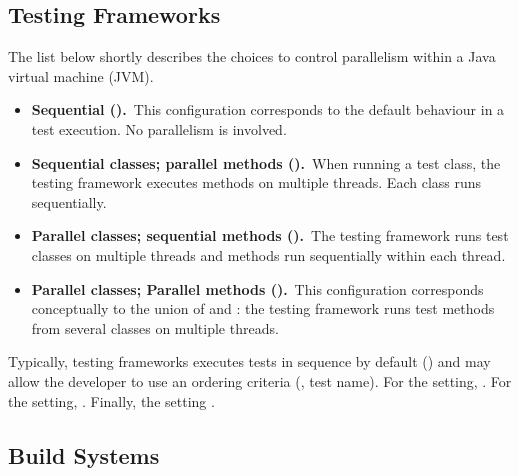 

\subsection{Testing Frameworks}
\label{sec:frameworks}

The list below shortly describes the choices to control parallelism
within a Java virtual machine (JVM).

\begin{itemize}
\item
    \textbf{Sequential (\Seq).}~This configuration corresponds to the
        default behaviour in a test execution. No parallelism is
        involved.
\item
    \textbf{Sequential classes; parallel methods
        (\SeqClassParMeth).}~When running a test class, the testing
        framework executes methods on multiple threads. Each class
        runs sequentially.
\item
    \textbf{Parallel classes; sequential methods
        (\ParClassSeqMeth{}).}~The testing framework runs test classes
        on multiple threads and methods run sequentially within each
        thread.
\item
    \textbf{Parallel classes; Parallel methods
        (\ParClassParMeth).}~This configuration corresponds
        conceptually to the union of \ParClassSeqMeth{} and
        \SeqClassParMeth{}: the testing framework runs test methods
        from several classes on multiple threads.
\end{itemize}

Typically, testing frameworks executes tests in sequence by default
(\Seq{}) and may allow the developer to use an ordering criteria (\eg,
test name).  For the \SeqClassParMeth{} setting, .
For the \ParClassSeqMeth{} setting, . Finally, the
\ParClassParMeth{} setting .

\subsection{Build Systems}
\label{sec:builder}

